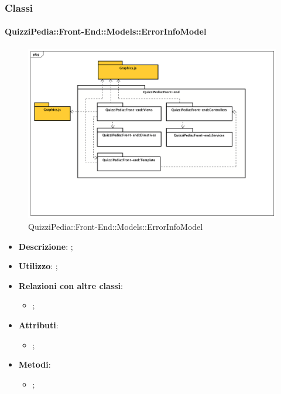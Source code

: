 	\subsubsection{Classi}
		\paragraph{QuizziPedia::Front-End::Models::ErrorInfoModel}
		
				\label{QuizziPedia::Front-End::Models::ErrorInfoModel}
				
				\begin{figure}[h]
					\centering
					\includegraphics[scale=0.5,keepaspectratio]{UML/Package/QuizziPedia_Front-end.png}
					\caption{QuizziPedia::Front-End::Models::ErrorInfoModel}
				\end{figure}
			
			\begin{itemize}
				\item \textbf{Descrizione}: ;
				\item \textbf{Utilizzo}: ;
				\item \textbf{Relazioni con altre classi}: 
				\begin{itemize}
					\item ;
				\end{itemize}
				\item \textbf{Attributi}: 
				\begin{itemize}
					\item ;
				\end{itemize}
				\item \textbf{Metodi}: 
				\begin{itemize}
					\item ;
				\end{itemize}
			\end{itemize}
			
